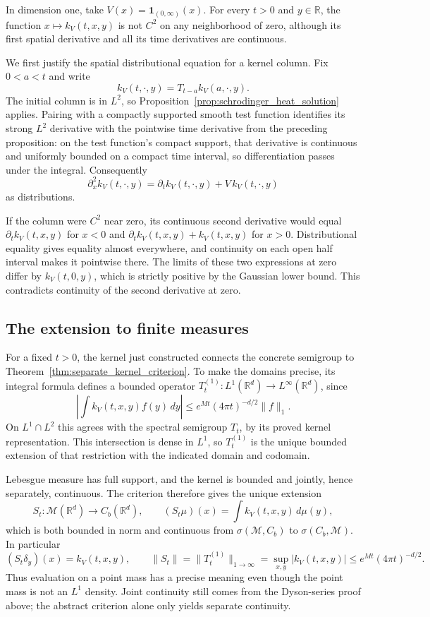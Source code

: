 \begin{example}
In dimension one, take $V(x)=\mathbf1_{(0,\infty)}(x)$. For every
$t>0$ and $y\in\mathbb R$, the function $x\mapsto k_V(t,x,y)$
is not $C^2$ on any neighborhood of zero, although its first spatial
derivative and all its time derivatives are continuous.
\end{example}
\Proof
We first justify the spatial distributional equation for a kernel
column. Fix $0<a<t$ and write
\[
k_V(t,\cdot,y)=T_{t-a}k_V(a,\cdot,y).
\]
The initial column is in $L^2$, so
Proposition~\ref{prop:schrodinger_heat_solution} applies. Pairing with
a compactly supported smooth test function identifies its strong
$L^2$ derivative with the pointwise time derivative from the preceding
proposition: on the test function's compact support, that derivative
is continuous and uniformly bounded on a compact time interval, so
differentiation passes under the integral. Consequently
\[
\partial_x^2 k_V(t,\cdot,y)
=\partial_t k_V(t,\cdot,y)+V\,k_V(t,\cdot,y)
\]
as distributions.

If the column were $C^2$ near zero, its continuous second derivative
would equal $\partial_t k_V(t,x,y)$ for $x<0$ and
$\partial_t k_V(t,x,y)+k_V(t,x,y)$ for $x>0$. Distributional
equality gives equality almost everywhere, and continuity on each
open half interval makes it pointwise there. The limits of these
two expressions at zero differ by $k_V(t,0,y)$, which is strictly
positive by the Gaussian lower bound. This contradicts continuity
of the second derivative at zero.
\Done

\subsection{The extension to finite measures}
For a fixed $t>0$, the kernel just constructed connects the concrete
semigroup to Theorem~\ref{thm:separate_kernel_criterion}. To make the
domains precise, its integral formula defines a bounded operator
$T_t^{(1)}:L^1(\mathbb R^d)\to L^\infty(\mathbb R^d)$, since
\[
\left|\int k_V(t,x,y)f(y)\,dy\right|
\leq e^{Mt}(4\pi t)^{-d/2}\|f\|_1.
\]
On $L^1\cap L^2$ this agrees with the spectral semigroup $T_t$,
by its proved kernel representation. This intersection is dense in
$L^1$, so $T_t^{(1)}$ is the unique bounded extension of that restriction
with the indicated domain and codomain.

Lebesgue measure has full support, and the kernel is bounded and
jointly, hence separately, continuous. The criterion therefore gives
the unique extension
\[
S_t:\mathcal M(\mathbb R^d)\longrightarrow C_b(\mathbb R^d),
\qquad (S_t\mu)(x)=\int k_V(t,x,y)\,d\mu(y),
\]
which is both bounded in norm and continuous from $\sigma(\mathcal M,C_b)$ to
$\sigma(C_b,\mathcal M)$. In particular
\[
(S_t\delta_y)(x)=k_V(t,x,y),\qquad
\|S_t\|=\|T_t^{(1)}\|_{1\to\infty}
=\sup_{x,y}|k_V(t,x,y)|
\leq e^{Mt}(4\pi t)^{-d/2}.
\]
Thus evaluation on a point mass has a precise meaning even though
the point mass is not an $L^1$ density. Joint continuity still comes
from the Dyson-series proof above; the abstract criterion alone
only yields separate continuity.

